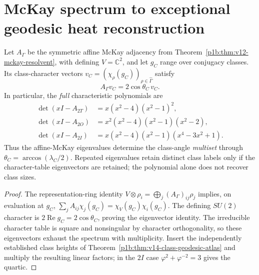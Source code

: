 \documentclass[11pt]{article}
\begin{document}
\section{McKay spectrum to exceptional geodesic heat reconstruction}
\label{p1b:sec:v16-spectral-reconstruction}
\begin{theorem}
\label{p1b:thm:v16-mckay-class-angles}
Let $A_\Gamma$ be the symmetric affine McKay adjacency from
Theorem~\ref{p1b:thm:v12-mckay-resolvent}, with defining
$V=\mathbb C^2$, and let $g_C$ range over conjugacy classes.
Its class-character vectors
$v_C=(\chi_\rho(g_C))_{\rho\in\widehat\Gamma}$ satisfy
\[A_\Gamma v_C=2\cos\theta_C\,v_C.
\]
In particular, the \emph{full} characteristic polynomials are
\begin{equation}
\begin{aligned}
\det(xI-A_{2T})&=x(x^2-4)(x^2-1)^2,\\
\det(xI-A_{2O})&=x^2(x^2-4)(x^2-1)(x^2-2),\\
\det(xI-A_{2I})&=x(x^2-4)(x^2-1)(x^4-3x^2+1).
\end{aligned}
\tag{T16.4}\label{p1b:eq:v16-mckay-class-poly}
\end{equation}
Thus the affine-McKay eigenvalues determine the class-angle
\emph{multiset} through $\theta_C=\arccos(\lambda_C/2)$.
Repeated eigenvalues retain distinct class labels only if the
character-table eigenvectors are retained; the polynomial alone does
not recover class sizes.
\end{theorem}
\begin{proof}
The representation-ring identity $V\otimes\rho_i
=\bigoplus_j (A_\Gamma)_{ij}\rho_j$ implies, on evaluation
at $g_C$, $\sum_j A_{ij}\chi_j(g_C)
=\chi_V(g_C)\chi_i(g_C)$.  The defining $SU(2)$ character
is $2\operatorname{Re}g_C=2\cos\theta_C$, proving the eigenvector
identity.  The irreducible character table is square and nonsingular
by character orthogonality, so these eigenvectors exhaust the
spectrum with multiplicity. Insert the independently established
class heights of Theorem~\ref{p1b:thm:v14-class-geodesic-atlas}
and multiply the resulting linear factors; in the $2I$ case
$\varphi^2+\varphi^{-2}=3$ gives the quartic.
\end{proof}
\end{document}
